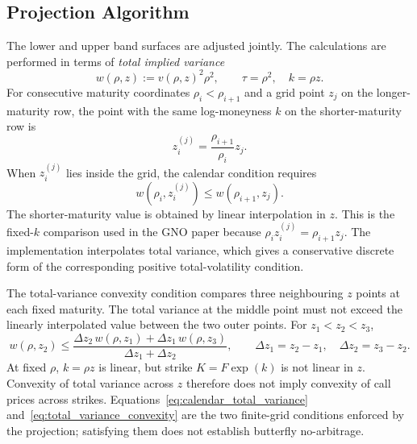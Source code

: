 \subsection{Projection Algorithm}
\label{subsec:projection_algorithm}

The lower and upper band surfaces are adjusted jointly. The calculations are performed in terms of \emph{total implied variance}
\begin{equation}
    w(\rho,z):=v(\rho,z)^2\rho^2,
    \qquad \tau=\rho^2,\quad k=\rho z.
    \label{eq:total_variance_transformed}
\end{equation}
For consecutive maturity coordinates $\rho_i<\rho_{i+1}$ and a grid point $z_j$ on the longer-maturity row, the point with the same log-moneyness $k$ on the shorter-maturity row is
\begin{equation}
    z_{i}^{(j)}=\frac{\rho_{i+1}}{\rho_i}z_j.
    \label{eq:fixed_k_mapping}
\end{equation}
When $z_i^{(j)}$ lies inside the grid, the calendar condition requires
\begin{equation}
    w\!\left(\rho_i,z_i^{(j)}\right)
    \leq w(\rho_{i+1},z_j).
    \label{eq:calendar_total_variance}
\end{equation}
The shorter-maturity value is obtained by linear interpolation in $z$. This is the fixed-$k$ comparison used in the GNO paper because $\rho_i z_i^{(j)}=\rho_{i+1}z_j$. The implementation interpolates total variance, which gives a conservative discrete form of the corresponding positive total-volatility condition.

The total-variance convexity condition compares three neighbouring $z$ points at each fixed maturity. The total variance at the middle point must not exceed the linearly interpolated value between the two outer points. For $z_1<z_2<z_3$,
\begin{equation}
    w(\rho,z_2)\leq
    \frac{\Delta z_2\,w(\rho,z_1)+\Delta z_1\,w(\rho,z_3)}
    {\Delta z_1+\Delta z_2},
    \qquad
    \Delta z_1=z_2-z_1,\quad \Delta z_2=z_3-z_2.
    \label{eq:total_variance_convexity}
\end{equation}
At fixed $\rho$, $k=\rho z$ is linear, but strike $K=F\exp(k)$ is not linear in $z$. Convexity of total variance across $z$ therefore does not imply convexity of call prices across strikes. Equations~\ref{eq:calendar_total_variance} and~\ref{eq:total_variance_convexity} are the two finite-grid conditions enforced by the projection; satisfying them does not establish butterfly no-arbitrage.


